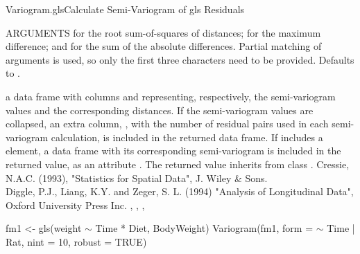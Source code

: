 \documentclass[pdftex]{article} \usepackage{url,graphicx}
\renewcommand{\Twiddle}{\mbox{\(\sim\)}}
\begin{document}
\begin{Helpfile}{Variogram.gls}{Calculate Semi-Variogram of gls Residuals}
\begin{Argument}{ARGUMENTS}
 for the root sum-of-squares of distances;
 for the maximum difference; and 
for the sum of the absolute differences. Partial matching of
arguments is used, so only the first three characters need to be
provided. Defaults to .
\end{Argument}
a data frame with columns  and  representing,
respectively, the semi-variogram values and the corresponding
distances. If the semi-variogram values are collapsed, an extra
column, , with the number of residual pairs used in each
semi-variogram calculation, is included in the returned data frame. If
 includes a  element, a data frame with its
corresponding semi-variogram is included in the returned value, as an
attribute . The returned value inherits from class
.
Cressie, N.A.C. (1993), "Statistics for Spatial Data", J. Wiley \& Sons.\\
Diggle, P.J., Liang, K.Y. and Zeger, S. L. (1994) "Analysis of
Longitudinal Data", Oxford University Press Inc. 
, ,
, 
\need 15pt
\vspace{-16pt}
\begin{Example}
fm1 <- gls(weight {\Twiddle} Time * Diet, BodyWeight)
Variogram(fm1, form = {\Twiddle} Time | Rat, nint = 10, robust = TRUE)
\end{Example}
\end{Helpfile}
\end{document}
